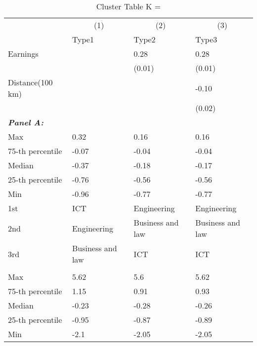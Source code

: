 \begin{table}
\centering
\caption{Cluster Table K = }
\centering
\begin{threeparttable}
\begin{tabular}[t]{llll}
\toprule
\multicolumn{1}{c}{ } & \multicolumn{1}{c}{(1)} & \multicolumn{1}{c}{(2)} & \multicolumn{1}{c}{(3)} \\
\cmidrule(l{3pt}r{3pt}){2-2} \cmidrule(l{3pt}r{3pt}){3-3} \cmidrule(l{3pt}r{3pt}){4-4}
 & Type1 & Type2 & Type3\\
\midrule
\addlinespace[0.3em]
Earnings & &0.28  &0.28\\
& &(0.01)&(0.01)\\
Distance(100 km)& & & -0.10\\
& & &(0.02)\\
\multicolumn{4}{l}{\textit{\textbf{Panel A: }}}\\
\hspace{1em}Max & 0.32 & 0.16 & 0.16\\
\hspace{1em}75-th percentile & -0.07 & -0.04 & -0.04\\
\hspace{1em}Median & -0.37 & -0.18 & -0.17\\
\hspace{1em}25-th percentile & -0.76 & -0.56 & -0.56\\
\hspace{1em}Min & -0.96 & -0.77 & -0.77\\
\hspace{1em}1st & ICT & Engineering & Engineering\\
\hspace{1em}2nd & Engineering & Business and law & Business and law\\
\hspace{1em}3rd & Business and law & ICT & ICT\\
\addlinespace[0.3em]
\multicolumn{4}{l}{\textit{\textbf{Panel B: }}}\\
\hspace{1em}Max & 5.62 & 5.6 & 5.62\\
\hspace{1em}75-th percentile & 1.15 & 0.91 & 0.93\\
\hspace{1em}Median & -0.23 & -0.28 & -0.26\\
\hspace{1em}25-th percentile & -0.95 & -0.87 & -0.89\\
\hspace{1em}Min & -2.1 & -2.05 & -2.05\\

\end{tabular}
\end{threeparttable}
\end{table}
